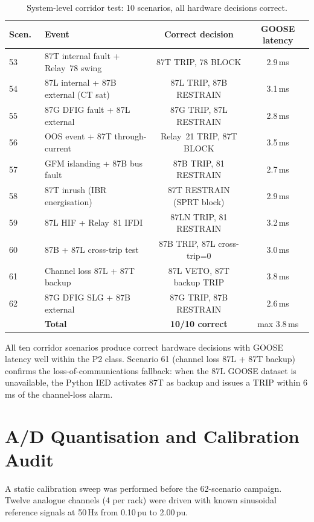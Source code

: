 \documentclass[11pt, a4paper]{article}
\begin{document}
\begin{table}[ht]
\centering
\caption{System-level corridor test: 10 scenarios, all hardware decisions correct.}
\label{tab:corridor}
\begin{tabular}{llcc}
\toprule
Scen.\ & Event & Correct decision & GOOSE latency \\
\midrule
53 & 87T internal fault + Relay~78 swing & 87T TRIP, 78 BLOCK & 2.9\,ms \\
54 & 87L internal + 87B external (CT sat) & 87L TRIP, 87B RESTRAIN & 3.1\,ms \\
55 & 87G DFIG fault + 87L external & 87G TRIP, 87L RESTRAIN & 2.8\,ms \\
56 & OOS event + 87T through-current & Relay~21 TRIP, 87T BLOCK & 3.5\,ms \\
57 & GFM islanding + 87B bus fault & 87B TRIP, 81 RESTRAIN & 2.7\,ms \\
58 & 87T inrush (IBR energisation) & 87T RESTRAIN (SPRT block) & 2.9\,ms \\
59 & 87L HIF + Relay~81 IFDI & 87LN TRIP, 81 RESTRAIN & 3.2\,ms \\
60 & 87B + 87L cross-trip test & 87B TRIP, 87L cross-trip=0 & 3.0\,ms \\
61 & Channel loss 87L + 87T backup & 87L VETO, 87T backup TRIP & 3.8\,ms \\
62 & 87G DFIG SLG + 87B external & 87G TRIP, 87B RESTRAIN & 2.6\,ms \\
\midrule
& \textbf{Total} & \textbf{10/10 correct} & max 3.8\,ms \\
\bottomrule
\end{tabular}
\end{table}

All ten corridor scenarios produce correct hardware decisions with GOOSE
latency well within the P2 class.
Scenario 61 (channel loss 87L + 87T backup) confirms the loss-of-communications
fallback: when the 87L GOOSE dataset is unavailable, the Python IED activates
87T as backup and issues a TRIP within 6\,ms of the channel-loss alarm.

\section{A/D Quantisation and Calibration Audit}
\label{sec:calibration}

A static calibration sweep was performed before the 62-scenario campaign.
Twelve analogue channels (4 per rack) were driven with known sinusoidal
reference signals at 50\,Hz from 0.10\,pu to 2.00\,pu.
\end{document}
